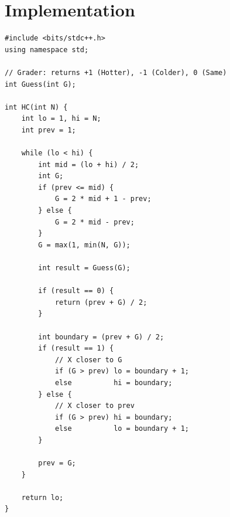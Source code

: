 \documentclass[11pt,a4paper]{article}
\begin{document}
\section{Implementation}

\begin{lstlisting}
#include <bits/stdc++.h>
using namespace std;

// Grader: returns +1 (Hotter), -1 (Colder), 0 (Same)
int Guess(int G);

int HC(int N) {
    int lo = 1, hi = N;
    int prev = 1;

    while (lo < hi) {
        int mid = (lo + hi) / 2;
        int G;
        if (prev <= mid) {
            G = 2 * mid + 1 - prev;
        } else {
            G = 2 * mid - prev;
        }
        G = max(1, min(N, G));

        int result = Guess(G);

        if (result == 0) {
            return (prev + G) / 2;
        }

        int boundary = (prev + G) / 2;
        if (result == 1) {
            // X closer to G
            if (G > prev) lo = boundary + 1;
            else          hi = boundary;
        } else {
            // X closer to prev
            if (G > prev) hi = boundary;
            else          lo = boundary + 1;
        }

        prev = G;
    }

    return lo;
}
\end{lstlisting}
\end{document}
